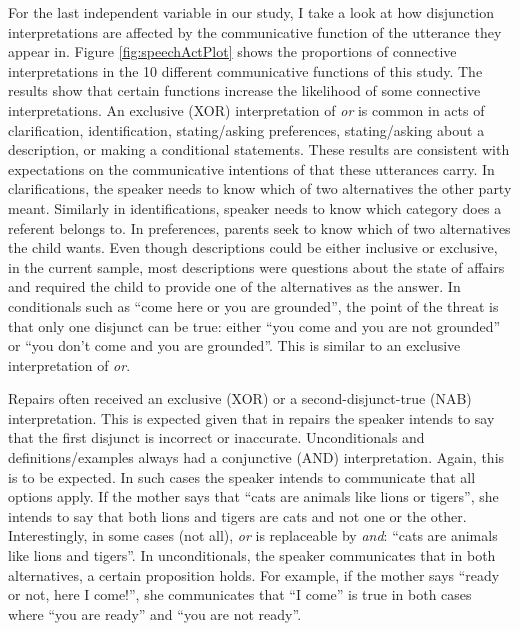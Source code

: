 \documentclass[floatsintext,man]{apa6}
\theoremstyle{definition}
\theoremstyle{definition}
\theoremstyle{definition}
\theoremstyle{remark}
\begin{document}
For the last independent variable in our study, I take a look at how
disjunction interpretations are affected by the communicative function
of the utterance they appear in. Figure \ref{fig:speechActPlot} shows
the proportions of connective interpretations in the 10 different
communicative functions of this study. The results show that certain
functions increase the likelihood of some connective interpretations. An
exclusive (XOR) interpretation of \emph{or} is common in acts of
clarification, identification, stating/asking preferences,
stating/asking about a description, or making a conditional statements.
These results are consistent with expectations on the communicative
intentions of that these utterances carry. In clarifications, the
speaker needs to know which of two alternatives the other party meant.
Similarly in identifications, speaker needs to know which category does
a referent belongs to. In preferences, parents seek to know which of two
alternatives the child wants. Even though descriptions could be either
inclusive or exclusive, in the current sample, most descriptions were
questions about the state of affairs and required the child to provide
one of the alternatives as the answer. In conditionals such as
\enquote{come here or you are grounded}, the point of the threat is that
only one disjunct can be true: either \enquote{you come and you are not
grounded} or \enquote{you don't come and you are grounded}. This is
similar to an exclusive interpretation of \emph{or}.

Repairs often received an exclusive (XOR) or a second-disjunct-true
(NAB) interpretation. This is expected given that in repairs the speaker
intends to say that the first disjunct is incorrect or inaccurate.
Unconditionals and definitions/examples always had a conjunctive (AND)
interpretation. Again, this is to be expected. In such cases the speaker
intends to communicate that all options apply. If the mother says that
\enquote{cats are animals like lions or tigers}, she intends to say that
both lions and tigers are cats and not one or the other. Interestingly,
in some cases (not all), \emph{or} is replaceable by \emph{and}:
\enquote{cats are animals like lions and tigers}. In unconditionals, the
speaker communicates that in both alternatives, a certain proposition
holds. For example, if the mother says \enquote{ready or not, here I
come!}, she communicates that \enquote{I come} is true in both cases
where \enquote{you are ready} and \enquote{you are not ready}.
\end{document}
